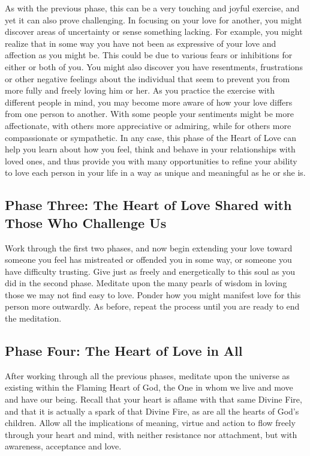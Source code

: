 As with the previous phase, this can be a very touching and joyful exercise, and yet it can
also prove challenging. In focusing on your love for another, you might discover areas of uncertainty or sense something lacking. For example, you might realize that in some way
you have not been as expressive of your love and affection as you might be. This could
be due to various fears or inhibitions for either or both of you. You might also discover
you have resentments, frustrations or other negative feelings about the individual that
seem to prevent you from more fully and freely loving him or her. As you practice the
exercise with different people in mind, you may become more aware of how your love
differs from one person to another. With some people your sentiments might be more
affectionate, with others more appreciative or admiring, while for others more
compassionate or sympathetic. In any case, this phase of the Heart of Love can help you
learn about how you feel, think and behave in your relationships with loved ones, and
thus provide you with many opportunities to refine your ability to love each person in
your life in a way as unique and meaningful as he or she is.

\subsection{Phase Three: The Heart of Love Shared with Those Who Challenge Us}

Work through the first two phases, and now begin extending your love toward someone
you feel has mistreated or offended you in some way, or someone you have difficulty
trusting. Give just as freely and energetically to this soul as you did in the second phase.
Meditate upon the many pearls of wisdom in loving those we may not find easy to love.
Ponder how you might manifest love for this person more outwardly. As before, repeat
the process until you are ready to end the meditation.

\subsection{Phase Four: The Heart of Love in All}

After working through all the previous phases, meditate upon the universe as existing
within the Flaming Heart of God, the One in whom we live and move and have our
being. Recall that your heart is aflame with that same Divine Fire, and that it is actually a
spark of that Divine Fire, as are all the hearts of God’s children. Allow all the
implications of meaning, virtue and action to flow freely through your heart and mind,
with neither resistance nor attachment, but with awareness, acceptance and love.